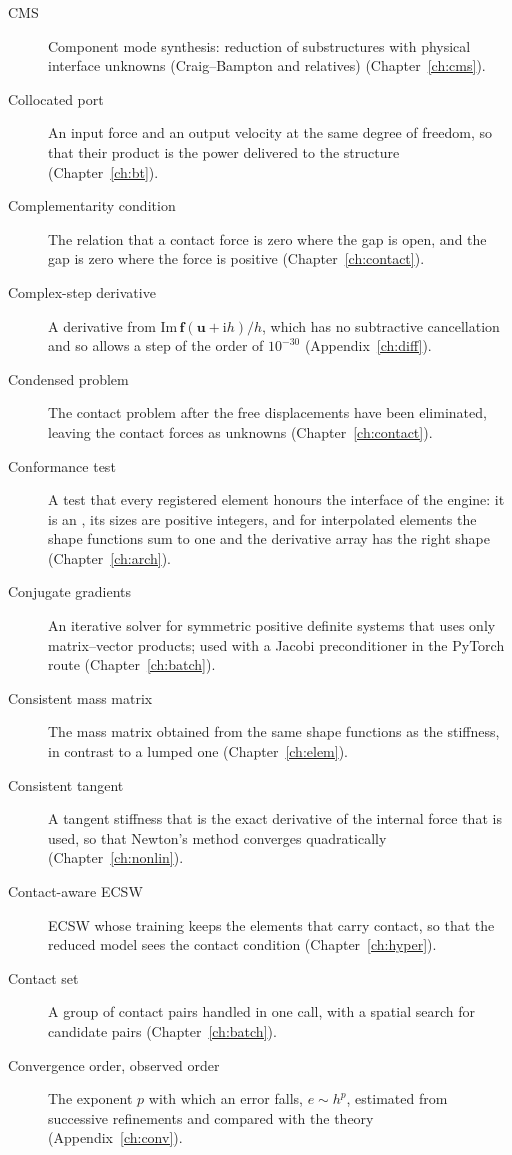 \begin{description}
\item[CMS] Component mode synthesis: reduction of substructures with physical interface unknowns (Craig--Bampton and relatives) (Chapter~\ref{ch:cms}).
\item[Collocated port] An input force and an output velocity at the same degree of freedom, so that their product is the power delivered to the structure (Chapter~\ref{ch:bt}).
\item[Complementarity condition] The relation that a contact force is zero where the gap is open, and the gap is zero where the force is positive (Chapter~\ref{ch:contact}).
\item[Complex-step derivative] A derivative from $\mathrm{Im}\,\bm f(\bm u+\mathrm i h)/h$, which has no subtractive cancellation and so allows a step of the order of $10^{-30}$ (Appendix~\ref{ch:diff}).
\item[Condensed problem] The contact problem after the free displacements have been eliminated, leaving the contact forces as unknowns (Chapter~\ref{ch:contact}).
\item[Conformance test] A test that every registered element honours the interface of the engine: it is an , its sizes are positive integers, and for interpolated elements the shape functions sum to one and the derivative array has the right shape (Chapter~\ref{ch:arch}).
\item[Conjugate gradients] An iterative solver for symmetric positive definite systems that uses only matrix--vector products; used with a Jacobi preconditioner in the PyTorch route (Chapter~\ref{ch:batch}).
\item[Consistent mass matrix] The mass matrix obtained from the same shape functions as the stiffness, in contrast to a lumped one (Chapter~\ref{ch:elem}).
\item[Consistent tangent] A tangent stiffness that is the exact derivative of the internal force that is used, so that Newton's method converges quadratically (Chapter~\ref{ch:nonlin}).
\item[Contact-aware ECSW] ECSW whose training keeps the elements that carry contact, so that the reduced model sees the contact condition (Chapter~\ref{ch:hyper}).
\item[Contact set] A group of contact pairs handled in one call, with a spatial search for candidate pairs (Chapter~\ref{ch:batch}).
\item[Convergence order, observed order] The exponent $p$ with which an error falls, $e\sim h^p$, estimated from successive refinements and compared with the theory (Appendix~\ref{ch:conv}).

\end{description}

